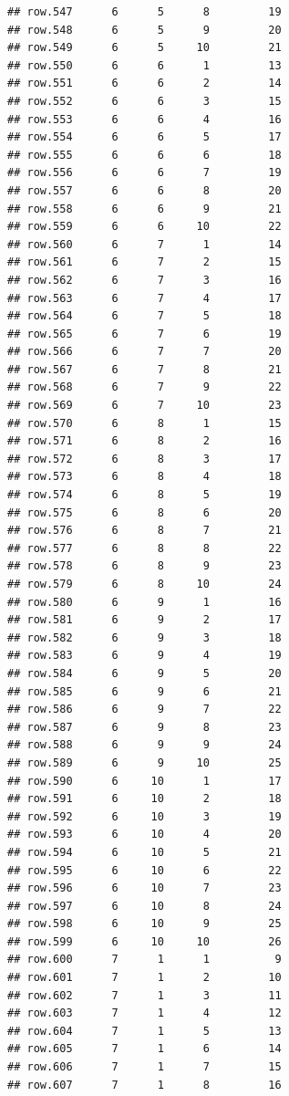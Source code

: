 \documentclass[
]{article}
\begin{document}
\begin{verbatim}
## row.547      6      5      8         19
## row.548      6      5      9         20
## row.549      6      5     10         21
## row.550      6      6      1         13
## row.551      6      6      2         14
## row.552      6      6      3         15
## row.553      6      6      4         16
## row.554      6      6      5         17
## row.555      6      6      6         18
## row.556      6      6      7         19
## row.557      6      6      8         20
## row.558      6      6      9         21
## row.559      6      6     10         22
## row.560      6      7      1         14
## row.561      6      7      2         15
## row.562      6      7      3         16
## row.563      6      7      4         17
## row.564      6      7      5         18
## row.565      6      7      6         19
## row.566      6      7      7         20
## row.567      6      7      8         21
## row.568      6      7      9         22
## row.569      6      7     10         23
## row.570      6      8      1         15
## row.571      6      8      2         16
## row.572      6      8      3         17
## row.573      6      8      4         18
## row.574      6      8      5         19
## row.575      6      8      6         20
## row.576      6      8      7         21
## row.577      6      8      8         22
## row.578      6      8      9         23
## row.579      6      8     10         24
## row.580      6      9      1         16
## row.581      6      9      2         17
## row.582      6      9      3         18
## row.583      6      9      4         19
## row.584      6      9      5         20
## row.585      6      9      6         21
## row.586      6      9      7         22
## row.587      6      9      8         23
## row.588      6      9      9         24
## row.589      6      9     10         25
## row.590      6     10      1         17
## row.591      6     10      2         18
## row.592      6     10      3         19
## row.593      6     10      4         20
## row.594      6     10      5         21
## row.595      6     10      6         22
## row.596      6     10      7         23
## row.597      6     10      8         24
## row.598      6     10      9         25
## row.599      6     10     10         26
## row.600      7      1      1          9
## row.601      7      1      2         10
## row.602      7      1      3         11
## row.603      7      1      4         12
## row.604      7      1      5         13
## row.605      7      1      6         14
## row.606      7      1      7         15
## row.607      7      1      8         16

\end{verbatim}
\end{document}
